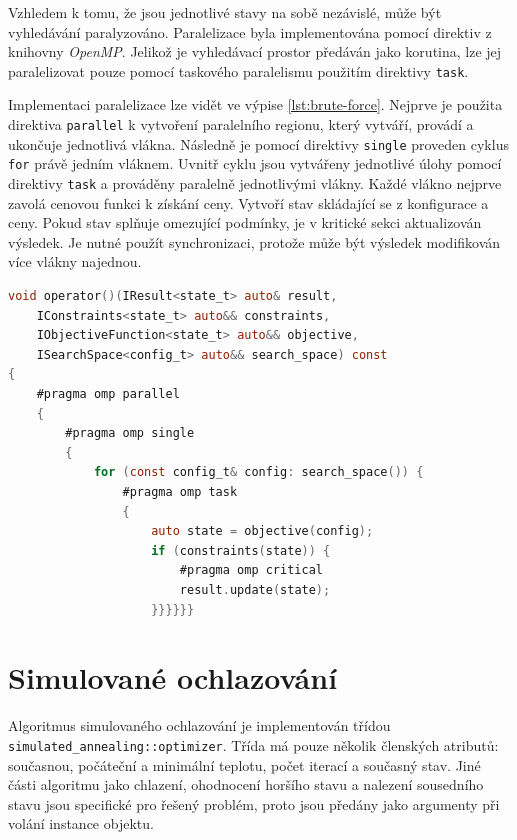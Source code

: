 Vzhledem k tomu, že jsou jednotlivé stavy na sobě nezávislé, může být vyhledávání paralyzováno.
Paralelizace byla implementována pomocí direktiv z knihovny \textit{OpenMP}.
Jelikož je vyhledávací prostor předáván jako korutina, lze jej paralelizovat pouze pomocí taskového paralelismu použitím direktivy \texttt{task}.

Implementaci paralelizace lze vidět ve výpise \ref{lst:brute-force}.
Nejprve je použita direktiva \texttt{parallel} k vytvoření paralelního regionu, který vytváří, provádí a ukončuje jednotlivá vlákna.
Následně je pomocí direktivy \texttt{single} proveden cyklus \texttt{for} právě jedním vláknem.
Uvnitř cyklu jsou vytvářeny jednotlivé úlohy pomocí direktivy \texttt{task} a prováděny paralelně jednotlivými vlákny.
Každé vlákno nejprve zavolá cenovou funkci k získání ceny.
Vytvoří stav skládající se z konfigurace a ceny.
Pokud stav splňuje omezující podmínky, je v kritické sekci aktualizován výsledek.
Je nutné použít synchronizaci, protože může být výsledek modifikován více vlákny najednou.

\begin{lstlisting}[caption={~Optimalizace pomocí algoritmu hrubé síly},label={lst:brute-force},captionpos=t,abovecaptionskip=-\medskipamount,belowcaptionskip=\medskipamount,language=C]
void operator()(IResult<state_t> auto& result,
    IConstraints<state_t> auto&& constraints,
    IObjectiveFunction<state_t> auto&& objective,
    ISearchSpace<config_t> auto&& search_space) const
{
    #pragma omp parallel
    {
        #pragma omp single
        {
            for (const config_t& config: search_space()) {
                #pragma omp task
                {
                    auto state = objective(config);
                    if (constraints(state)) {
                        #pragma omp critical
                        result.update(state);
                    }}}}}}
\end{lstlisting}

\section{Simulované ochlazování}
Algoritmus simulovaného ochlazování je implementován třídou \texttt{simulated\_annealing::optimizer}.
Třída má pouze několik členských atributů: současnou, počáteční a minimální teplotu, počet iterací a současný stav.
Jiné části algoritmu jako chlazení, ohodnocení horšího stavu a nalezení sousedního stavu jsou specifické pro řešený problém, proto jsou předány jako argumenty při volání instance objektu.

